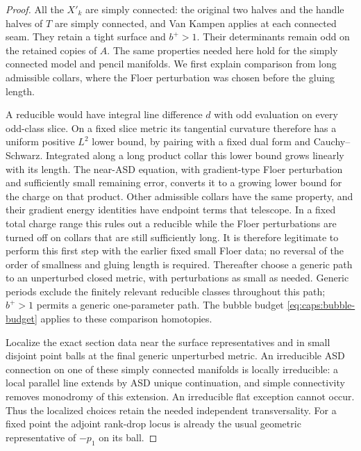 \begin{proof}
All the $X'_k$ are simply connected: the original two halves and the
handle halves of $T$ are simply connected, and Van Kampen applies at
each connected seam.  They retain a tight surface and $b^+>1$.
Their determinants remain odd on the retained copies of $A$.
The same properties needed here hold for the simply connected model and
pencil manifolds.  We first explain comparison from long admissible
collars, where the Floer perturbation was chosen before the gluing
length.

A reducible would have integral line difference $d$ with odd evaluation
on every odd-class slice.  On a fixed slice metric its tangential
curvature therefore has a uniform positive $L^2$ lower bound, by pairing
with a fixed dual form and Cauchy--Schwarz.  Integrated along a long
product collar this lower bound grows linearly with its length.  The
near-ASD equation, with gradient-type Floer perturbation and sufficiently
small remaining error, converts it to a growing lower bound for the
charge on that product.  Other admissible collars have the same
property, and their gradient energy identities have endpoint terms
that telescope.  In a fixed total charge range this rules out a
reducible while the Floer perturbations are turned off on collars that
are still sufficiently long.  It is therefore legitimate to perform
this first step with the earlier fixed small Floer data; no reversal of
the order of smallness and gluing length is required.  Thereafter choose
a generic path to an unperturbed closed metric, with perturbations as
small as needed.  Generic periods exclude the finitely relevant
reducible classes throughout this path; $b^+>1$ permits a generic
one-parameter path.  The bubble budget
\eqref{eq:caps:bubble-budget} applies to these comparison homotopies.

Localize the exact section data near the surface representatives and in
small disjoint point balls at the final generic unperturbed metric.
An irreducible ASD connection on one of these simply connected
manifolds is locally irreducible: a local parallel line extends by ASD
unique continuation, and simple connectivity removes monodromy of this
extension.  An irreducible flat exception cannot occur.  Thus the
localized choices retain the needed independent transversality.
For a fixed point the adjoint rank-drop locus is already the usual
geometric representative of $-p_1$ on its ball.


\end{proof}
